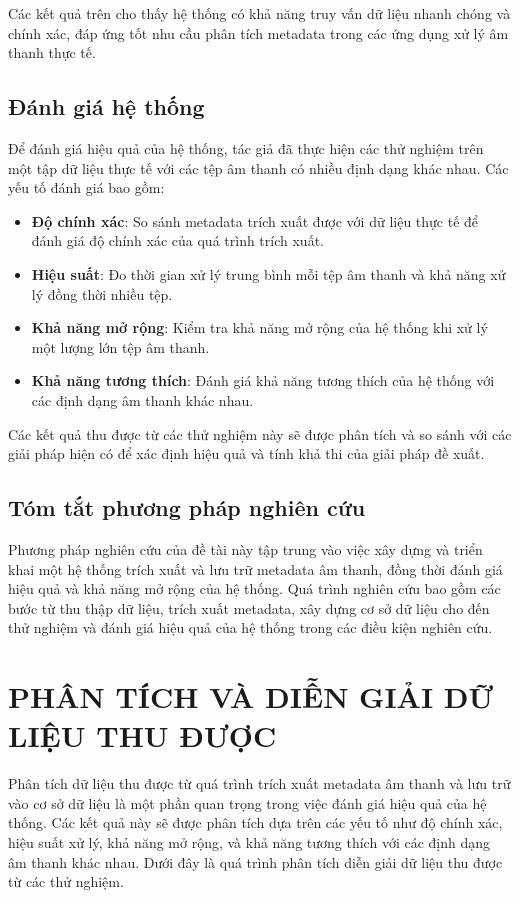 \documentclass[conference]{IEEEtran}
\begin{document}
Các kết quả trên cho thấy hệ thống có khả năng truy vấn dữ liệu nhanh chóng và chính xác, đáp ứng tốt nhu cầu phân tích metadata trong các ứng dụng xử lý âm thanh thực tế.

\subsection{Đánh giá hệ thống}
Để đánh giá hiệu quả của hệ thống, tác giả đã thực hiện các thử nghiệm trên một tập dữ liệu thực tế với các tệp âm thanh có nhiều định dạng khác nhau. Các yếu tố đánh giá bao gồm:
\begin{itemize}
    \item \textbf{Độ chính xác}: So sánh metadata trích xuất được với dữ liệu thực tế để đánh giá độ chính xác của quá trình trích xuất.
    \item \textbf{Hiệu suất}: Đo thời gian xử lý trung bình mỗi tệp âm thanh và khả năng xử lý đồng thời nhiều tệp.
    \item \textbf{Khả năng mở rộng}: Kiểm tra khả năng mở rộng của hệ thống khi xử lý một lượng lớn tệp âm thanh.
    \item \textbf{Khả năng tương thích}: Đánh giá khả năng tương thích của hệ thống với các định dạng âm thanh khác nhau.
\end{itemize}

Các kết quả thu được từ các thử nghiệm này sẽ được phân tích và so sánh với các giải pháp hiện có để xác định hiệu quả và tính khả thi của giải pháp đề xuất.

\subsection{Tóm tắt phương pháp nghiên cứu}
Phương pháp nghiên cứu của đề tài này tập trung vào việc xây dựng và triển khai một hệ thống trích xuất và lưu trữ metadata âm thanh, đồng thời đánh giá hiệu quả và khả năng mở rộng của hệ thống. Quá trình nghiên cứu bao gồm các bước từ thu thập dữ liệu, trích xuất metadata, xây dựng cơ sở dữ liệu cho đến thử nghiệm và đánh giá hiệu quả của hệ thống trong các điều kiện nghiên cứu.

\section{PHÂN TÍCH VÀ DIỄN GIẢI DỮ LIỆU THU ĐƯỢC}

Phân tích dữ liệu thu được từ quá trình trích xuất metadata âm thanh và lưu trữ vào cơ sở dữ liệu là một phần quan trọng trong việc đánh giá hiệu quả của hệ thống. Các kết quả này sẽ được phân tích dựa trên các yếu tố như độ chính xác, hiệu suất xử lý, khả năng mở rộng, và khả năng tương thích với các định dạng âm thanh khác nhau. Dưới đây là quá trình phân tích diễn giải dữ liệu thu được từ các thử nghiệm.
\end{document}
